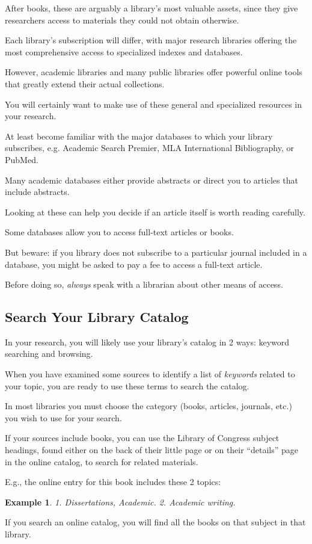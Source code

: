 \documentclass[oneside]{book}
\numberwithin{equation}{section}
\newtheorem{example}{Example}[section]
\begin{document}
After books, these are arguably a library's most valuable assets, since they give researchers access to materials they could not obtain otherwise.

Each library's subscription will differ, with major research libraries offering the most comprehensive access to specialized indexes and databases.

However, academic libraries and many public libraries offer powerful online tools that greatly extend their actual collections.

You will certainly want to make use of these general and specialized resources in your research.

At least become familiar with the major databases to which your library subscribes, e.g. Academic Search Premier, MLA International Bibliography, or PubMed.

Many academic databases either provide abstracts or direct you to articles that include abstracts.

Looking at these can help you decide if an article itself is worth reading carefully.

Some databases allow you to access full-text articles or books.

But beware: if you library does not subscribe to a particular journal included in a database, you might be asked to pay a fee to access a full-text article.

Before doing so, \textit{always} speak with a librarian about other means of access.

\subsection{Search Your Library Catalog}
In your research, you will likely use your library's catalog in 2 ways: keyword searching and browsing.

When you have examined some sources to identify a list of \textit{keywords} related to your topic, you are ready to use these terms to search the catalog.

In most libraries you must choose the category (books, articles, journals, etc.) you wish to use for your search.

%
If your sources include books, you can use the Library of Congress subject headings, found either on the back of their little page or on their ``details'' page in the online catalog, to search for related materials.

E.g., the online entry for this book includes these 2 topics:
\begin{example}
    1. Dissertations, Academic. 2. Academic writing.
\end{example}
If you search an online catalog, you will find all the books on that subject in that library.
\end{document}
